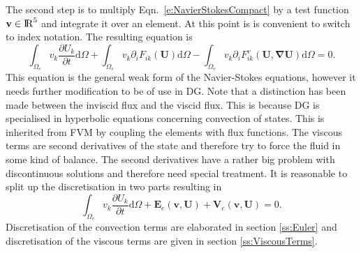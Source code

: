 \documentclass{report}
\newcommand{\dt}[1]{\frac{\partial #1}{\partial t}}
\begin{document}
The second step is to multiply Eqn.~\ref{e:NavierStokesCompact} by a test function $\mathbf{v} \in {\rm I\!R}^5$ and integrate it over an element. At this point is is convenient to switch to index notation. The resulting equation is
\begin{equation}
\label{e:weakForm1}
\int_{\Omega_e} v_k \dt{U_k} \mathrm{d}\Omega
+ \int_{\Omega_e} v_k \partial_i {F}_{ik}(\mathbf{U}) \mathrm{d}\Omega
- \int_{\Omega_e} v_k \partial_i {F}_{ik}^v(\mathbf{U},\mathbf{\nabla \mathbf{U}}) \mathrm{d}\Omega = 0.
\end{equation}
This equation is the general weak form of the Navier-Stokes equations, however it needs further modification to be of use in DG. Note that a distinction has been made between the inviscid flux and the viscid flux. This is because DG is specialised in hyperbolic equations concerning convection of states. This is inherited from FVM by coupling the elements with flux functions. The viscous terms are second derivatives of the state and therefore try to force the fluid in some kind of balance. The second derivatives have a rather big problem with discontinuous solutions and therefore need special treatment. It is reasonable to split up the discretisation in two parts resulting in
\begin{equation}
\label{e:weakForm2}
\int_{\Omega_e} v_k \dt{U_k} \mathrm{d}\Omega
+ \mathbf{E}_e(\mathbf{v},\mathbf{U})
+ \mathbf{V}_e(\mathbf{v},\mathbf{U}) = 0.
\end{equation} 
Discretisation of the convection terms are elaborated in section \ref{ss:Euler} and discretisation of the viscous terms are given in section \ref{ss:ViscousTerms}.
\end{document}
